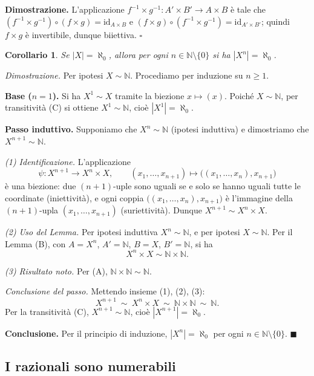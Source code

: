 \documentclass[11pt,a4paper]{article}
\newcommand{\N}{\mathbb{N}}
\newcommand{\id}{\mathrm{id}}
\newcommand{\inv}{^{-1}}
\theoremstyle{definition}
\theoremstyle{plain}
\newtheorem{corollario}[definizione]{Corollario}
\theoremstyle{remark}
\begin{document}
\textbf{Dimostrazione.} L'applicazione $f\inv\times g\inv\colon A'\times B'\to A\times B$ è tale che $(f\inv\times g\inv)\circ(f\times g)=\id_{A\times B}$ e $(f\times g)\circ(f\inv\times g\inv)=\id_{A'\times B'}$; quindi $f\times g$ è invertibile, dunque biiettiva. \hfill$\square$

\begin{corollario}\label{cor:Xn}
Se $|X|=\aleph_0$, allora per ogni $n\in\N\setminus\{0\}$ si ha $|X^n|=\aleph_0$.
\end{corollario}

\noindent\textit{Dimostrazione.} Per ipotesi $X\sim\mathbb{N}$.
Procediamo per induzione su $n\ge 1$.

\smallskip
\noindent\textbf{Base ($n=1$).} Si ha $X^1\sim X$ tramite la biezione
$x\mapsto(x)$. Poich\'e $X\sim\mathbb{N}$, per transitivit\`a (C)
si ottiene $X^1\sim\mathbb{N}$, cio\`e $|X^1|=\aleph_0$.

\smallskip
\noindent\textbf{Passo induttivo.} Supponiamo che $X^n\sim\mathbb{N}$
(ipotesi induttiva) e dimostriamo che $X^{n+1}\sim\mathbb{N}$.

\emph{(1) Identificazione.} L'applicazione
\[
\psi\colon X^{n+1}\to X^n\times X,\qquad
(x_1,\dots,x_{n+1})\mapsto\bigl((x_1,\dots,x_n),x_{n+1}\bigr)
\]
\`e una biezione: due $(n+1)$-uple sono uguali se e solo se hanno uguali
tutte le coordinate (iniettivit\`a), e ogni coppia
$\bigl((x_1,\dots,x_n),x_{n+1}\bigr)$ \`e l'immagine della
$(n+1)$-upla $(x_1,\dots,x_{n+1})$ (suriettivit\`a). Dunque
$X^{n+1}\sim X^n\times X$.

\emph{(2) Uso del Lemma.} Per ipotesi induttiva $X^n\sim\mathbb{N}$, e per
ipotesi $X\sim\mathbb{N}$. Per il Lemma (B), con $A=X^n$, $A'=\mathbb{N}$,
$B=X$, $B'=\mathbb{N}$, si ha
\[
X^n\times X\sim\mathbb{N}\times\mathbb{N}.
\]

\emph{(3) Risultato noto.} Per (A), $\mathbb{N}\times\mathbb{N}\sim\mathbb{N}$.

\emph{Conclusione del passo.} Mettendo insieme (1), (2), (3):
\[
X^{n+1}\ \sim\ X^n\times X\ \sim\ \mathbb{N}\times\mathbb{N}\ \sim\ \mathbb{N}.
\]
Per la transitivit\`a (C), $X^{n+1}\sim\mathbb{N}$, cio\`e
$|X^{n+1}|=\aleph_0$.

\smallskip
\noindent\textbf{Conclusione.} Per il principio di induzione,
$|X^n|=\aleph_0$ per ogni $n\in\mathbb{N}\setminus\{0\}$.
\hfill$\blacksquare$


\subsection{I razionali sono numerabili}
\end{document}
